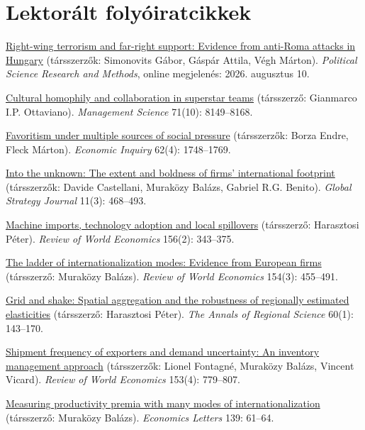 \documentclass[10pt,a4paper]{article}
\newcommand{\jn}[1]{\textit{#1}}
\begin{document}
\section{Lektorált folyóiratcikkek}
\begin{cvlist}
  \item[2026] \href{https://doi.org/10.1017/psrm.2026.10111}{Right-wing terrorism and far-right support: Evidence from anti-Roma attacks in Hungary} (társszerzők: Simonovits Gábor, Gáspár Attila, Végh Márton). \jn{Political Science Research and Methods}, online megjelenés: 2026. augusztus 10.
  \item[2025] \href{https://doi.org/10.1287/mnsc.2022.01799}{Cultural homophily and collaboration in superstar teams} (társszerző: Gianmarco I.P. Ottaviano). \jn{Management Science} 71(10): 8149--8168.
  \item[2024] \href{https://doi.org/10.1111/ecin.13245}{Favoritism under multiple sources of social pressure} (társszerzők: Borza Endre, Fleck Márton). \jn{Economic Inquiry} 62(4): 1748--1769.
  \item[2021] \href{https://doi.org/10.1002/gsj.1397}{Into the unknown: The extent and boldness of firms' international footprint} (társszerzők: Davide Castellani, Muraközy Balázs, Gabriel R.G. Benito). \jn{Global Strategy Journal} 11(3): 468--493.
  \item[2020] \href{https://doi.org/10.1007/s10290-019-00365-y}{Machine imports, technology adoption and local spillovers} (társszerző: Harasztosi Péter). \jn{Review of World Economics} 156(2): 343--375.
  \item[2018] \href{https://doi.org/10.1007/s10290-018-0305-9}{The ladder of internationalization modes: Evidence from European firms} (társszerző: Muraközy Balázs). \jn{Review of World Economics} 154(3): 455--491.
  \item[2018] \href{https://doi.org/10.1007/s00168-017-0849-y}{Grid and shake: Spatial aggregation and the robustness of regionally estimated elasticities} (társszerző: Harasztosi Péter). \jn{The Annals of Regional Science} 60(1): 143--170.
  \item[2017] \href{https://doi.org/10.1007/s10290-017-0286-0}{Shipment frequency of exporters and demand uncertainty: An inventory management approach} (társszerzők: Lionel Fontagné, Muraközy Balázs, Vincent Vicard). \jn{Review of World Economics} 153(4): 779--807.
  \item[2016] \href{https://doi.org/10.1016/j.econlet.2015.12.016}{Measuring productivity premia with many modes of internationalization} (társszerző: Muraközy Balázs). \jn{Economics Letters} 139: 61--64.

\end{cvlist}
\end{document}
